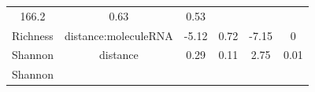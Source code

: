 \documentclass[]{article}
\begin{document}
\begin{longtable}[]{@{}cccccc@{}}
\begin{minipage}[t]{0.14\columnwidth}
166.2\strut
\end{minipage} & \begin{minipage}[t]{0.12\columnwidth}\centering\strut
0.63\strut
\end{minipage} & \begin{minipage}[t]{0.09\columnwidth}\centering\strut
0.53\strut
\end{minipage}\tabularnewline
\begin{minipage}[t]{0.12\columnwidth}\centering\strut
Richness\strut
\end{minipage} & \begin{minipage}[t]{0.24\columnwidth}\centering\strut
distance:moleculeRNA\strut
\end{minipage} & \begin{minipage}[t]{0.11\columnwidth}\centering\strut
-5.12\strut
\end{minipage} & \begin{minipage}[t]{0.14\columnwidth}\centering\strut
0.72\strut
\end{minipage} & \begin{minipage}[t]{0.12\columnwidth}\centering\strut
-7.15\strut
\end{minipage} & \begin{minipage}[t]{0.09\columnwidth}\centering\strut
0\strut
\end{minipage}\tabularnewline
\begin{minipage}[t]{0.12\columnwidth}\centering\strut
Shannon\strut
\end{minipage} & \begin{minipage}[t]{0.24\columnwidth}\centering\strut
distance\strut
\end{minipage} & \begin{minipage}[t]{0.11\columnwidth}\centering\strut
0.29\strut
\end{minipage} & \begin{minipage}[t]{0.14\columnwidth}\centering\strut
0.11\strut
\end{minipage} & \begin{minipage}[t]{0.12\columnwidth}\centering\strut
2.75\strut
\end{minipage} & \begin{minipage}[t]{0.09\columnwidth}\centering\strut
0.01\strut
\end{minipage}\tabularnewline
\begin{minipage}[t]{0.12\columnwidth}\centering\strut
Shannon\strut
\end{minipage} & \begin{minipage}[t]{0.24\columnwidth}\centering\strut

\end{minipage}
\end{longtable}
\end{document}

